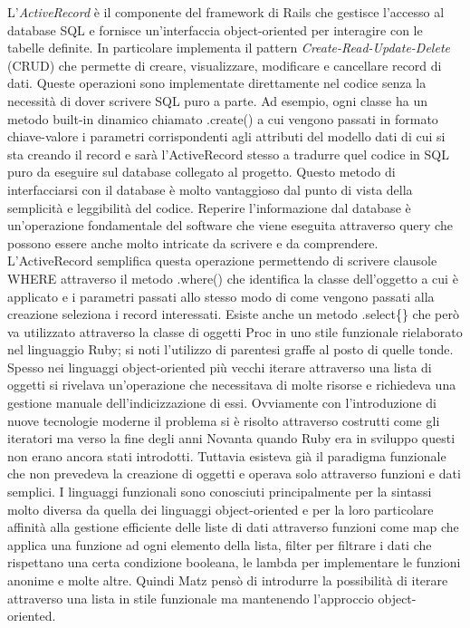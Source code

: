 \documentclass[target=bach,aauheader=,style=]{thud}
\begin{document}
L'\textit{ActiveRecord} è il componente del framework di Rails che gestisce l'accesso al database SQL e fornisce un'interfaccia object-oriented per interagire con le tabelle definite.
In particolare implementa il pattern \textit{Create-Read-Update-Delete} (CRUD) \cite{ibm_crud} che permette di creare, visualizzare, modificare
e cancellare record di dati. Queste operazioni sono implementate direttamente nel codice senza la necessità di dover scrivere SQL puro a parte. Ad esempio, ogni classe ha un metodo built-in dinamico
chiamato .create() a cui vengono passati in formato chiave-valore i parametri corrispondenti agli attributi del modello dati di cui si sta creando il record e sarà l'ActiveRecord stesso a tradurre
quel codice in SQL puro da eseguire sul database collegato al progetto. Questo metodo di interfacciarsi con il database è molto vantaggioso dal punto di vista della semplicità e leggibilità del codice.
Reperire l'informazione dal database è un'operazione fondamentale del software che viene eseguita attraverso query che possono essere anche molto intricate
da scrivere e da comprendere. L'ActiveRecord semplifica questa operazione permettendo di scrivere clausole WHERE attraverso il metodo .where() che identifica la classe dell'oggetto
a cui è applicato e i parametri passati allo stesso modo di come vengono passati alla creazione seleziona i record interessati. Esiste anche un metodo .select\{\} che però va utilizzato
attraverso la classe di oggetti Proc in uno stile funzionale rielaborato nel linguaggio Ruby; si noti l'utilizzo di parentesi graffe al posto di quelle tonde. Spesso nei linguaggi
object-oriented più vecchi iterare attraverso una lista di oggetti si rivelava un'operazione che necessitava di molte risorse e richiedeva una gestione manuale dell'indicizzazione di essi.
Ovviamente con l'introduzione di nuove tecnologie moderne il problema si è risolto attraverso costrutti come gli iteratori ma verso la fine degli anni Novanta quando Ruby era in sviluppo
questi non erano ancora stati introdotti. Tuttavia esisteva già il paradigma funzionale che non prevedeva la creazione di oggetti e operava solo attraverso funzioni e dati semplici.
I linguaggi funzionali sono conosciuti principalmente per la sintassi molto diversa da quella dei linguaggi object-oriented e per la loro particolare affinità alla gestione
efficiente delle liste di dati attraverso funzioni come map che applica una funzione ad ogni elemento della lista, filter per filtrare i dati che rispettano una certa condizione booleana,
le lambda per implementare le funzioni anonime e molte altre. Quindi Matz pensò di introdurre la possibilità di iterare attraverso una lista in stile funzionale ma mantenendo l'approccio object-oriented.
\end{document}
